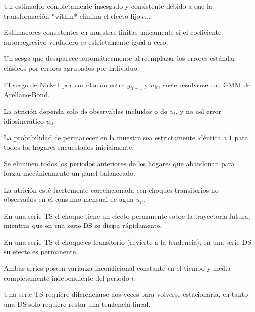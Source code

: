 \begin{opts}
    \item Un estimador completamente insesgado y consistente debido a que la transformación *within* elimina el efecto fijo $\alpha_i$.
    \item Estimadores consistentes en muestras finitas únicamente si el coeficiente autorregresivo verdadero es estrictamente igual a cero.
    \item Un sesgo que desaparece automáticamente al reemplazar los errores estándar clásicos por errores agrupados por individuo.
    \item El sesgo de Nickell por correlación entre $\tilde{y}_{it-1}$ y $\tilde{u}_{it}$; suele resolverse con GMM de Arellano-Bond.
\end{opts}

\begin{opts}
    \item La atrición dependa solo de observables incluidos o de $\alpha_i$, y no del error idiosincrático $u_{it}$.
    \item La probabilidad de permanecer en la muestra sea estrictamente idéntica a $1$ para todos los hogares encuestados inicialmente.
    \item Se eliminen todos los periodos anteriores de los hogares que abandonan para forzar mecánicamente un panel balanceado.
    \item La atrición esté fuertemente correlacionada con choques transitorios no observados en el consumo mensual de agua $u_{it}$.
\end{opts}

\begin{opts}
    \item En una serie TS el choque tiene un efecto permanente sobre la trayectoria futura, mientras que en una serie DS se disipa rápidamente.
    \item En una serie TS el choque es transitorio (revierte a la tendencia); en una serie DS su efecto es permanente.
    \item Ambas series poseen varianza incondicional constante en el tiempo y media completamente independiente del periodo $t$.
    \item Una serie TS requiere diferenciarse dos veces para volverse estacionaria, en tanto una DS solo requiere restar una tendencia lineal.
\end{opts}

